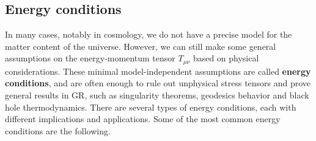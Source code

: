 \subsection{Energy conditions}

In many cases, notably in cosmology, we do not have a precise model for the matter content of the universe.
However, we can still make some general assumptions on the energy-momentum tensor $T_{\mu\nu}$ based on physical considerations.
These minimal model-independent assumptions are called \textbf{energy conditions}, and are often enough to rule out unphysical stress tensors and prove general results in GR, such as singularity theorems, geodesics behavior and black hole thermodynamics.
There are several types of energy conditions, each with different implications and applications.
Some of the most common energy conditions are the following.
